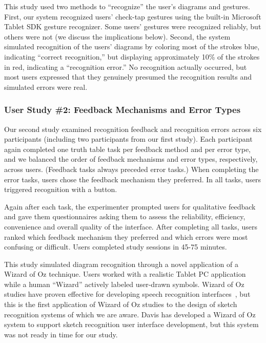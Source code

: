 \documentclass{egpubl}
\begin{document}
This study used two methods to ``recognize'' the user's diagrams and
gestures.  First, our system recognized users' check-tap gestures
using the built-in Microsoft Tablet SDK gesture recognizer.  Some
users' gestures were recognized reliably, but others were not (we
discuss the implications below).  Second, the system simulated
recognition of the users' diagrams by coloring most of the strokes
blue, indicating ``correct recognition,'' but displaying approximately
10\% of the strokes in red, indicating a ``recognition error.''  No
recognition actually occurred, but most users expressed that they genuinely presumed
the recognition results and simulated errors were real.

\subsubsection{User Study \#2: Feedback Mechanisms and Error Types}
Our second study examined recognition feedback and recognition errors
across six participants (including two participants from our first
study).  Each participant again completed one truth table task per
feedback method and per error type, and we balanced the order of
feedback mechanisms and error types, respectively, across users.
(Feedback tasks always preceded error tasks.)  When completing the
error tasks, users chose the feedback mechanism they preferred.  In all
tasks, users triggered recognition with a button. 

Again after each task, the experimenter prompted users for qualitative
feedback and gave them questionnaires asking them to assess the
reliability, efficiency, convenience and overall quality of the
interface.  After completing all tasks, users ranked which feedback
mechanism they preferred and which errors were most confusing or
difficult.  Users completed study sessions in 45-75 minutes.

This study simulated diagram recognition through a novel application
of a Wizard of Oz technique.  Users worked with a realistic Tablet PC
application while a human ``Wizard'' actively labeled user-drawn
symbols.  Wizard of Oz studies have proven effective for
developing speech recognition interfaces~\cite{169968,354406}, but
this is the first application of Wizard of Oz studies to the design of
sketch recognition systems of which we are aware.  Davis has developed a 
Wizard of Oz system to support sketch recognition user interface 
development\cite{Davis2007SketchWizard},
but this system was not ready in time for our study.  
\end{document}
